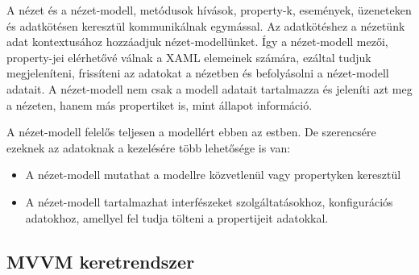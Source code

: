 \documentclass[
]{thesis-ekf}
\theoremstyle{definition}
\theoremstyle{remark}
\begin{document}
A nézet és a nézet-modell, metódusok hívások, property-k, események, üzeneteken és adatkötésen keresztül kommunikálnak egymással. Az adatkötéshez a nézetünk adat kontextusához hozzáadjuk nézet-modellünket. Így a nézet-modell mezői, property-jei elérhetővé válnak a XAML elemeinek számára, ezáltal tudjuk megjeleníteni, frissíteni az adatokat a nézetben és befolyásolni a nézet-modell adatait. A nézet-modell nem csak a modell adatait tartalmazza és jeleníti azt meg a nézeten, hanem más propertiket is, mint állapot információ.

A nézet-modell felelős teljesen a modellért ebben az estben. De szerencsére ezeknek az adatoknak a kezelésére több lehetősége is van:
\begin{itemize}
	\item A nézet-modell mutathat a modellre közvetlenül vagy propertyken keresztül
	\item A nézet-modell tartalmazhat interfészeket szolgáltatásokhoz, konfigurációs adatokhoz, amellyel fel tudja tölteni a propertijeit adatokkal.
\end{itemize}
\subsection{MVVM keretrendszer}
\end{document}
